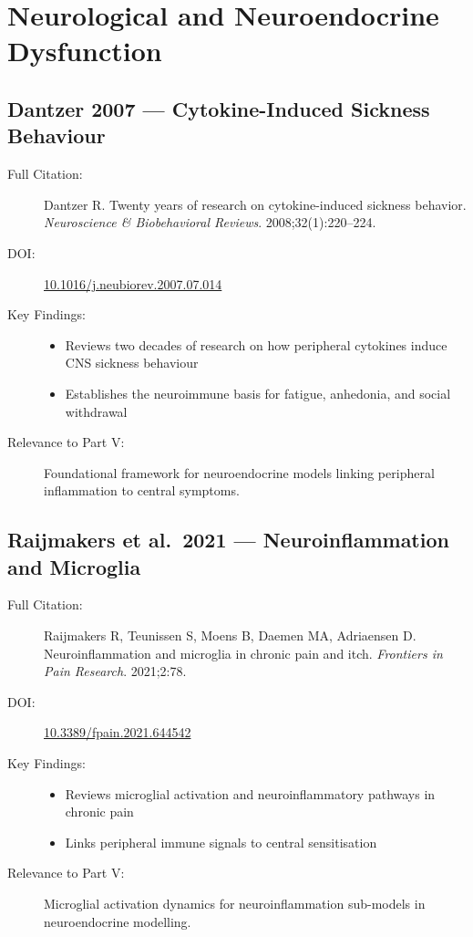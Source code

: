 \section{Neurological and Neuroendocrine Dysfunction}
\label{sec:bib-neuro-additions}

\subsection{Dantzer 2007 --- Cytokine-Induced Sickness Behaviour}

\begin{description}
    \item[Full Citation:] Dantzer R. Twenty years of research on cytokine-induced sickness behavior. \textit{Neuroscience \& Biobehavioral Reviews}. 2008;32(1):220--224. \cite{Dantzer2007twenty}
    \item[DOI:] \href{https://doi.org/10.1016/j.neubiorev.2007.07.014}{10.1016/j.neubiorev.2007.07.014}
    \item[Key Findings:]
    \begin{itemize}
        \item Reviews two decades of research on how peripheral cytokines induce CNS sickness behaviour
        \item Establishes the neuroimmune basis for fatigue, anhedonia, and social withdrawal
    \end{itemize}
    \item[Relevance to Part V:] Foundational framework for neuroendocrine models linking peripheral inflammation to central symptoms.
\end{description}

\subsection{Raijmakers et al.\ 2021 --- Neuroinflammation and Microglia}

\begin{description}
    \item[Full Citation:] Raijmakers R, Teunissen S, Moens B, Daemen MA, Adriaensen D. Neuroinflammation and microglia in chronic pain and itch. \textit{Frontiers in Pain Research}. 2021;2:78. \cite{Raijmakers2021Neuroinflammation}
    \item[DOI:] \href{https://doi.org/10.3389/fpain.2021.644542}{10.3389/fpain.2021.644542}
    \item[Key Findings:]
    \begin{itemize}
        \item Reviews microglial activation and neuroinflammatory pathways in chronic pain
        \item Links peripheral immune signals to central sensitisation
    \end{itemize}
    \item[Relevance to Part V:] Microglial activation dynamics for neuroinflammation sub-models in neuroendocrine modelling.
\end{description}


